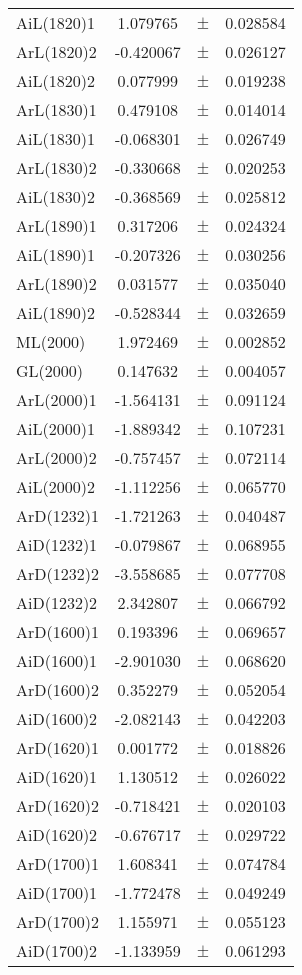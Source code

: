 \begin{table}
\begin{tiny}
\begin{tabular}{lccc}
AiL(1820)1 & 1.079765 & $\pm$ & 0.028584 \\
ArL(1820)2 & -0.420067 & $\pm$ & 0.026127 \\
AiL(1820)2 & 0.077999 & $\pm$ & 0.019238 \\
ArL(1830)1 & 0.479108 & $\pm$ & 0.014014 \\
AiL(1830)1 & -0.068301 & $\pm$ & 0.026749 \\
ArL(1830)2 & -0.330668 & $\pm$ & 0.020253 \\
AiL(1830)2 & -0.368569 & $\pm$ & 0.025812 \\
ArL(1890)1 & 0.317206 & $\pm$ & 0.024324 \\
AiL(1890)1 & -0.207326 & $\pm$ & 0.030256 \\
ArL(1890)2 & 0.031577 & $\pm$ & 0.035040 \\
AiL(1890)2 & -0.528344 & $\pm$ & 0.032659 \\
ML(2000) & 1.972469 & $\pm$ & 0.002852 \\
GL(2000) & 0.147632 & $\pm$ & 0.004057 \\
ArL(2000)1 & -1.564131 & $\pm$ & 0.091124 \\
AiL(2000)1 & -1.889342 & $\pm$ & 0.107231 \\
ArL(2000)2 & -0.757457 & $\pm$ & 0.072114 \\
AiL(2000)2 & -1.112256 & $\pm$ & 0.065770 \\
ArD(1232)1 & -1.721263 & $\pm$ & 0.040487 \\
AiD(1232)1 & -0.079867 & $\pm$ & 0.068955 \\
ArD(1232)2 & -3.558685 & $\pm$ & 0.077708 \\
AiD(1232)2 & 2.342807 & $\pm$ & 0.066792 \\
ArD(1600)1 & 0.193396 & $\pm$ & 0.069657 \\
AiD(1600)1 & -2.901030 & $\pm$ & 0.068620 \\
ArD(1600)2 & 0.352279 & $\pm$ & 0.052054 \\
AiD(1600)2 & -2.082143 & $\pm$ & 0.042203 \\
ArD(1620)1 & 0.001772 & $\pm$ & 0.018826 \\
AiD(1620)1 & 1.130512 & $\pm$ & 0.026022 \\
ArD(1620)2 & -0.718421 & $\pm$ & 0.020103 \\
AiD(1620)2 & -0.676717 & $\pm$ & 0.029722 \\
ArD(1700)1 & 1.608341 & $\pm$ & 0.074784 \\
AiD(1700)1 & -1.772478 & $\pm$ & 0.049249 \\
ArD(1700)2 & 1.155971 & $\pm$ & 0.055123 \\
AiD(1700)2 & -1.133959 & $\pm$ & 0.061293 \\
\bottomrule
\end{tabular}
\end{tiny}
\end{table}

